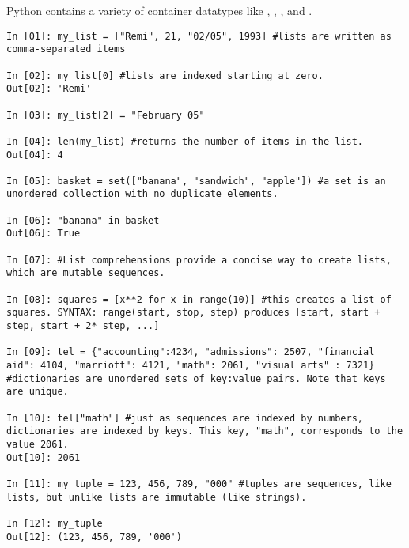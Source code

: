 \begin{example}
Python contains a variety of container datatypes like , , 
, and .

\begin{lstlisting}
In [01]: my_list = ["Remi", 21, "02/05", 1993] #lists are written as comma-separated items 

In [02]: my_list[0] #lists are indexed starting at zero.
Out[02]: 'Remi'

In [03]: my_list[2] = "February 05"

In [04]: len(my_list) #returns the number of items in the list.
Out[04]: 4

In [05]: basket = set(["banana", "sandwich", "apple"]) #a set is an unordered collection with no duplicate elements. 

In [06]: "banana" in basket
Out[06]: True

In [07]: #List comprehensions provide a concise way to create lists, which are mutable sequences. 

In [08]: squares = [x**2 for x in range(10)] #this creates a list of squares. SYNTAX: range(start, stop, step) produces [start, start + step, start + 2* step, ...]

In [09]: tel = {"accounting":4234, "admissions": 2507, "financial aid": 4104, "marriott": 4121, "math": 2061, "visual arts" : 7321} #dictionaries are unordered sets of key:value pairs. Note that keys are unique.

In [10]: tel["math"] #just as sequences are indexed by numbers, dictionaries are indexed by keys. This key, "math", corresponds to the value 2061.
Out[10]: 2061

In [11]: my_tuple = 123, 456, 789, "000" #tuples are sequences, like lists, but unlike lists are immutable (like strings). 

In [12]: my_tuple
Out[12]: (123, 456, 789, '000')



\end{lstlisting}
\end{example}

